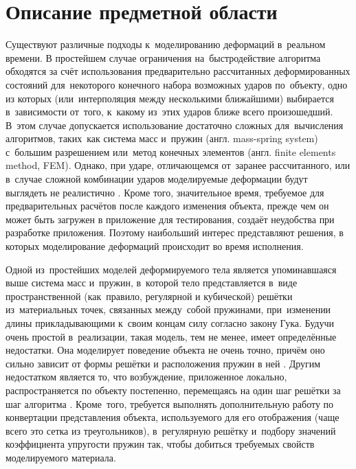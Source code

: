 \documentclass[a4paper,11pt]{report}
\begin{document}
  \chapter{Описание предметной области}\label{domain}

    Существуют различные подходы к~моделированию деформаций в~реальном времени. В простейшем случае
    ограничения на~быстродействие алгоритма обходятся за счёт использования предварительно рассчитанных
    деформированных состояний для~некоторого конечного набора возможных ударов по~объекту, одно из которых
    (или~интерполяция между несколькими ближайшими) выбирается в~зависимости от~того, к~какому
    из~этих ударов ближе всего произошедший. В~этом случае допускается использование достаточно сложных
    для~вычисления алгоритмов, таких~как система масс и~пружин (англ. {\English mass-spring system})
    с~большим разрешением или~метод конечных элементов (англ. {\English finite elements method, FEM}).
    Однако, при ударе, отличающемся от~заранее рассчитанного, или в~случае сложной комбинации ударов
    моделируемые деформации будут выглядеть не реалистично \cite[с.~1064]{chang-crash}. Кроме того, значительное время, требуемое
    для предварительных расчётов после каждого изменения объекта, прежде чем он может быть загружен
    в приложение для тестирования, создаёт неудобства при разработке приложения. Поэтому наибольший
    интерес представляют решения, в которых моделирование деформаций происходит во время исполнения.

    Одной из~простейших моделей деформируемого тела является упоминавшаяся выше система масс
    и~пружин, в~которой тело представляется в~виде пространственной (как~правило, регулярной и
    кубической) решётки из~материальных точек, связанных между~собой пружинами, при~изменении длины
    прикладывающими к~своим концам силу согласно закону Гука. Будучи очень простой в~реализации,
    такая модель, тем не менее, имеет определённые недостатки. Она моделирует поведение объекта не
    очень точно, причём оно сильно зависит от формы решётки и расположения пружин в ней \cite[с.~8]{mueller-physmodels}.
    Другим недостатком является то, что возбуждение, приложенное локально, распространяется по
    объекту постепенно, перемещаясь на один шаг решётки за шаг алгоритма \cite[с.~232]{parent-animation}.
    Кроме~того, требуется выполнять дополнительную работу по конвертации представления объекта,
    используемого для его отображения (чаще всего это сетка из треугольников), в~регулярную решётку
    и~подбору значений коэффициента упругости пружин так, чтобы добиться требуемых свойств
    моделируемого материала.
\end{document}
